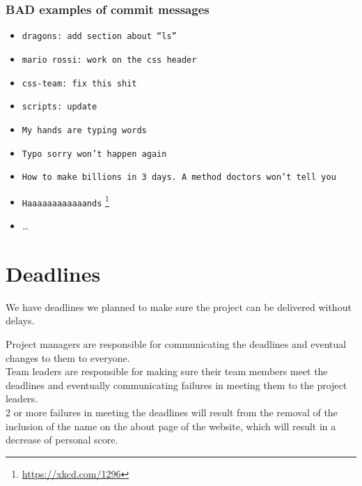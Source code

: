 \documentclass[hidelinks,12pt,a4paper,numbers=enddot]{scrartcl}
\begin{document}
\subsubsection{BAD examples of commit messages}

\begin{itemize}
\item \texttt{dragons: add section about ``ls''}
\item \texttt{mario rossi: work on the css header}
\item \texttt{css-team: fix this shit}
\item \texttt{scripts: update}
\item \texttt{My hands are typing words}
\item \texttt{Typo sorry won't happen again}
\item \texttt{How to make billions in 3 days. A method doctors won't tell you}
\item \texttt{Haaaaaaaaaaaands} \footnote{\url{https://xkcd.com/1296}}
\item \ldots
\end{itemize}

\newpage

\section{Deadlines}\label{deadlines}

We have deadlines  we planned to make sure the project can be delivered without delays.

Project managers are responsible for communicating the deadlines
and eventual changes to them to everyone.\\

Team leaders are responsible for making sure their team members
meet the deadlines and eventually communicating failures in meeting
them to the project leaders.\\

2 or more failures in meeting the deadlines will result from the removal
of the inclusion of the name on the about page of the website, which
will result in a decrease of personal score.
\end{document}
